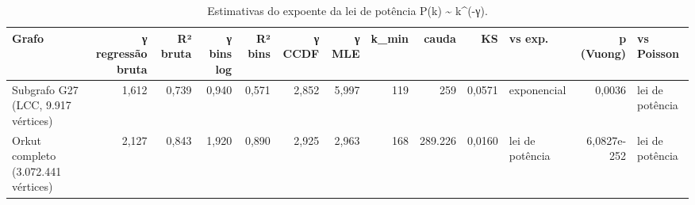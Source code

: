 \begin{table}[ht]
\centering
\caption{Estimativas do expoente da lei de potência P(k) \textasciitilde{} k\^{}(-γ).}
\label{tab:powerlaw}
\small
\begin{tabular}{p{3cm}rrrrrrrrrlrl}
\hline
Grafo & γ regressão bruta & R² bruta & γ bins log & R² bins & γ CCDF & γ MLE & k\_min & cauda & KS & vs exp. & p (Vuong) & vs Poisson \\
\hline
Subgrafo G27 (LCC, 9.917 vértices) & 1,612 & 0,739 & 0,940 & 0,571 & 2,852 & 5,997 & 119 & 259 & 0,0571 & exponencial & 0,0036 & lei de potência \\
Orkut completo (3.072.441 vértices) & 2,127 & 0,843 & 1,920 & 0,890 & 2,925 & 2,963 & 168 & 289.226 & 0,0160 & lei de potência & 6,0827e-252 & lei de potência \\
\hline
\end{tabular}
\end{table}
